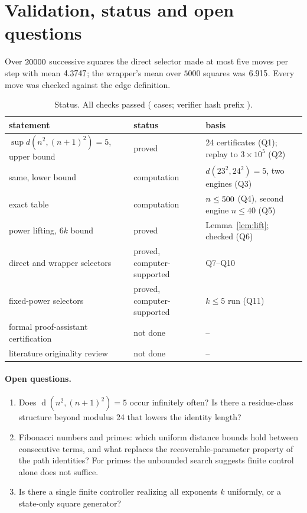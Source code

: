 \documentclass[11pt]{article}
\theoremstyle{definition}
\newcommand{\dist}{\operatorname{d}}
\begin{document}
\section{Validation, status and open questions}\label{sec:status}
Over $20000$ successive squares the direct selector made at most five moves per step with mean $4.3747$; the wrapper's mean over $5000$ squares was $6.915$. Every move was checked against the edge definition.
\begin{table}[ht]\centering\small
\begin{tabular}{@{}p{}p{}p{}@{}}\toprule
statement & status & basis\\\midrule
$\sup d(n^2,(n+1)^2)=5$, upper bound & proved & 24 certificates (Q1); replay to $3\times10^5$ (Q2)\\
same, lower bound & computation & $d(23^2,24^2)=5$, two engines (Q3)\\
exact table & computation & $n\le500$ (Q4), second engine $n\le40$ (Q5)\\
power lifting, $6k$ bound & proved & Lemma~\ref{lem:lift}; checked (Q6)\\
direct and wrapper selectors & proved, computer-supported & Q7--Q10\\
fixed-power selectors & proved, computer-supported & $k\le5$ run (Q11)\\
formal proof-assistant certification & not done & --\\
literature originality review & not done & --\\\bottomrule
\end{tabular}
\caption{Status. All checks passed (\TotalCases{} cases; verifier hash prefix \texttt{\VerSha}).}\label{tab:status}\end{table}
\paragraph{Open questions.}
\begin{enumerate}[nosep]
\item Does $\dist(n^2,(n+1)^2)=5$ occur infinitely often? Is there a residue-class structure beyond modulus 24 that lowers the identity length?
\item Fibonacci numbers and primes: which uniform distance bounds hold between consecutive terms, and what replaces the recoverable-parameter property of the path identities? For primes the unbounded search suggests finite control alone does not suffice.
\item Is there a single finite controller realizing all exponents $k$ uniformly, or a state-only square generator?
\end{enumerate}
\end{document}
